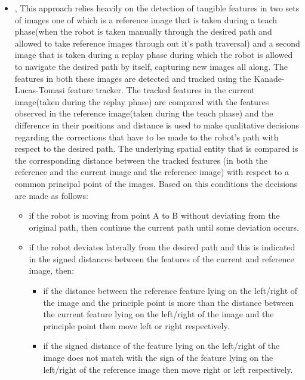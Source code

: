 	\begin{itemize}
	\item \cite{chen2006qualitative}, This approach relies heavily on the detection of tangible features in two sets of images one of which is a reference image that is taken during a teach phase(when the robot is taken manually through the desired path and allowed to take reference images through out it's path traversal) and a second image that is taken during a replay phase during which the robot is allowed to navigate the desired path by itself, capturing new images all along. The features in both these images are detected and tracked using the Kanade-Lucas-Tomasi \cite{birchfield2007klt} feature tracker. The tracked features in the current image(taken during the replay phase) are compared with the features observed in the reference image(taken during the teach phase) and the difference in their positions and distance is used to make qualitative decisions regarding the corrections that have to be made to the robot's path with respect to the desired path.
	The underlying spatial entity that is compared is the corresponding distance between the tracked features (in both the reference and the current image and the reference image) with respect to a common principal point of the images. Based on this conditions the decisions are made as follows:
	\begin{itemize}
		\item if the robot is moving from point A to B without deviating from the original path, then continue the current path until some deviation occurs.
		\item if the robot deviates laterally from the desired path and this is indicated in the signed distances between the features of the current and reference image, then:
		\begin{itemize}
			\item if the distance between the reference feature lying on the left/right of the image and the principle point is more than the distance between the current feature lying on the left/right of the image and the principle point then move left or right respectively.
			\item if the signed distance of the feature lying on the left/right of the image does not match with the sign of the feature lying on the left/right of the reference image then move right or left respectively.
		\end{itemize}
	\end{itemize} 

\end{itemize}
